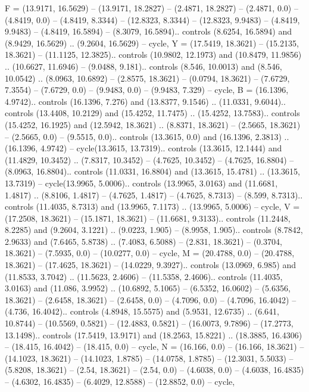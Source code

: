 {F} = {(13.9171, 16.5629) -- (13.9171, 18.2827) -- (2.4871, 18.2827) -- (2.4871, 0.0) -- (4.8419, 0.0) -- (4.8419, 8.3344) -- (12.8323, 8.3344) -- (12.8323, 9.9483) -- (4.8419, 9.9483) -- (4.8419, 16.5894) -- (8.3079, 16.5894).. controls (8.6254, 16.5894) and (8.9429, 16.5629) .. (9.2604, 16.5629) -- cycle},
{Y} = {(17.5419, 18.3621) -- (15.2135, 18.3621) -- (11.1125, 12.3825).. controls (10.9802, 12.1973) and (10.8479, 11.9856) .. (10.6627, 11.6946) -- (9.0488, 9.181).. controls (8.546, 10.0013) and (8.546, 10.0542) .. (8.0963, 10.6892) -- (2.8575, 18.3621) -- (0.0794, 18.3621) -- (7.6729, 7.3554) -- (7.6729, 0.0) -- (9.9483, 0.0) -- (9.9483, 7.329) -- cycle},
{B} = {(16.1396, 4.9742).. controls (16.1396, 7.276) and (13.8377, 9.1546) .. (11.0331, 9.6044).. controls (13.4408, 10.2129) and (15.4252, 11.7475) .. (15.4252, 13.7583).. controls (15.4252, 16.1925) and (12.5942, 18.3621) .. (8.8371, 18.3621) -- (2.5665, 18.3621) -- (2.5665, 0.0) -- (9.5515, 0.0).. controls (13.3615, 0.0) and (16.1396, 2.3813) .. (16.1396, 4.9742) -- cycle(13.3615, 13.7319).. controls (13.3615, 12.1444) and (11.4829, 10.3452) .. (7.8317, 10.3452) -- (4.7625, 10.3452) -- (4.7625, 16.8804) -- (8.0963, 16.8804).. controls (11.0331, 16.8804) and (13.3615, 15.4781) .. (13.3615, 13.7319) -- cycle(13.9965, 5.0006).. controls (13.9965, 3.0163) and (11.6681, 1.4817) .. (8.8106, 1.4817) -- (4.7625, 1.4817) -- (4.7625, 8.7313) -- (8.599, 8.7313).. controls (11.4035, 8.7313) and (13.9965, 7.1173) .. (13.9965, 5.0006) -- cycle},
{V} = {(17.2508, 18.3621) -- (15.1871, 18.3621) -- (11.6681, 9.3133).. controls (11.2448, 8.2285) and (9.2604, 3.1221) .. (9.0223, 1.905) -- (8.9958, 1.905).. controls (8.7842, 2.9633) and (7.6465, 5.8738) .. (7.4083, 6.5088) -- (2.831, 18.3621) -- (0.3704, 18.3621) -- (7.5935, 0.0) -- (10.0277, 0.0) -- cycle},
{M} = {(20.4788, 0.0) -- (20.4788, 18.3621) -- (17.4625, 18.3621) -- (14.0229, 9.3927).. controls (13.0969, 6.985) and (11.8533, 3.7042) .. (11.5623, 2.4606) -- (11.5358, 2.4606).. controls (11.4035, 3.0163) and (11.086, 3.9952) .. (10.6892, 5.1065) -- (6.5352, 16.0602) -- (5.6356, 18.3621) -- (2.6458, 18.3621) -- (2.6458, 0.0) -- (4.7096, 0.0) -- (4.7096, 16.4042) -- (4.736, 16.4042).. controls (4.8948, 15.5575) and (5.9531, 12.6735) .. (6.641, 10.8744) -- (10.5569, 0.5821) -- (12.4883, 0.5821) -- (16.0073, 9.7896) -- (17.2773, 13.1498).. controls (17.5419, 13.9171) and (18.2563, 15.8221) .. (18.3885, 16.4306) -- (18.415, 16.4042) -- (18.415, 0.0) -- cycle},
{N} = {(16.166, 0.0) -- (16.166, 18.3621) -- (14.1023, 18.3621) -- (14.1023, 1.8785) -- (14.0758, 1.8785) -- (12.3031, 5.5033) -- (5.8208, 18.3621) -- (2.54, 18.3621) -- (2.54, 0.0) -- (4.6038, 0.0) -- (4.6038, 16.4835) -- (4.6302, 16.4835) -- (6.4029, 12.8588) -- (12.8852, 0.0) -- cycle},

